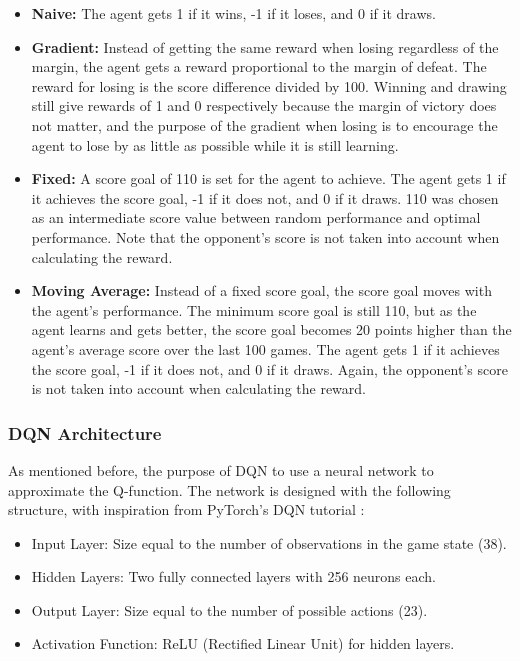 \documentclass[12pt]{article}
\begin{document}
\begin{itemize}
    \item \textbf{Naive:} The agent gets 1 if it wins, -1 if it loses, and 0 if it draws.
    \item \textbf{Gradient:} Instead of getting the same reward when losing regardless of the margin, the agent gets a reward proportional to the margin of defeat. The reward for losing is the score difference divided by 100. Winning and drawing still give rewards of 1 and 0 respectively because the margin of victory does not matter, and the purpose of the gradient when losing is to encourage the agent to lose by as little as possible while it is still learning.
    \item \textbf{Fixed:} A score goal of 110 is set for the agent to achieve. The agent gets 1 if it achieves the score goal, -1 if it does not, and 0 if it draws. 110 was chosen as an intermediate score value between random performance and optimal performance. Note that the opponent's score is not taken into account when calculating the reward.
    \item \textbf{Moving Average:} Instead of a fixed score goal, the score goal moves with the agent's performance. The minimum score goal is still 110, but as the agent learns and gets better, the score goal becomes 20 points higher than the agent's average score over the last 100 games. The agent gets 1 if it achieves the score goal, -1 if it does not, and 0 if it draws. Again, the opponent's score is not taken into account when calculating the reward.
\end{itemize}

\subsubsection{DQN Architecture}

As mentioned before, the purpose of DQN to use a neural network to approximate the Q-function. The network is designed with the following structure, with inspiration from PyTorch's DQN tutorial \cite{dqn}:
\begin{itemize}
    \item Input Layer: Size equal to the number of observations in the game state (38).
    \item Hidden Layers: Two fully connected layers with 256 neurons each.
    \item Output Layer: Size equal to the number of possible actions (23).
    \item Activation Function: ReLU (Rectified Linear Unit) for hidden layers.
\end{itemize}
\end{document}
